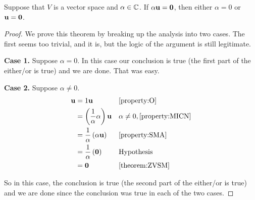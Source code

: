 \documentclass{ximera}
\begin{document}
\begin{theorem}
  \label{theorem:SMEZV}

  Suppose that $V$ is a vector space and $\alpha\in\mathbb{C}$.  If
  $\alpha\mathbf{u}=\mathbf{0}$, then either $\alpha=0$ or
  $\mathbf{u}=\mathbf{0}$.

  \begin{proof}
    We prove this theorem by breaking up the analysis into two cases.  The first seems too trivial, and it is, but the logic of the argument is still legitimate.

    \textbf{Case 1.}  Suppose $\alpha=0$.  In this case our conclusion
    is true (the first part of the either/or is true) and we are done.
    That was easy.
    
    \textbf{Case 2.}  Suppose $\alpha\neq 0$.
    \begin{align*}
      \mathbf{u}
      &=1\mathbf{u}
      &&\ref{property:O}\\
      &=\left(\frac{1}{\alpha}\alpha\right)\mathbf{u}
      &&\alpha\neq 0, \ref{property:MICN}\\
      &=\frac{1}{\alpha}\left(\alpha\mathbf{u}\right)
      &&\ref{property:SMA}\\
      &=\frac{1}{\alpha}\left(\mathbf{0}\right)
      &&\text{Hypothesis}\\
      &=\mathbf{0}&&\ref{theorem:ZVSM}
    \end{align*}

    So in this case, the conclusion is true (the second part of the either/or is true) and we are done since the conclusion was true in each of the two cases.
  \end{proof}
\end{theorem}
\end{document}
